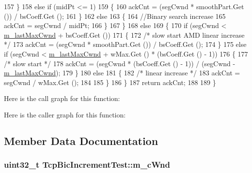\begin{DoxyCode}
157         \}
158       \textcolor{keywordflow}{else} \textcolor{keywordflow}{if} (midPt <= 1)
159         \{
160           ackCnt = (segCwnd * smoothPart.Get ()) / bsCoeff.Get ();
161         \}
162       \textcolor{keywordflow}{else}
163         \{
164           \textcolor{comment}{//Binary search increase}
165           ackCnt = segCwnd / midPt;
166         \}
167     \}
168   \textcolor{keywordflow}{else}
169     \{
170       \textcolor{keywordflow}{if} (segCwnd < \hyperlink{classTcpBicIncrementTest_abc6cf3f641221e276bd5eb67975b1037}{m\_lastMaxCwnd} + bsCoeff.Get ())
171         \{
172           \textcolor{comment}{/* slow start AMD linear increase */}
173           ackCnt = (segCwnd * smoothPart.Get ()) / bsCoeff.Get ();
174         \}
175       \textcolor{keywordflow}{else} \textcolor{keywordflow}{if} (segCwnd < \hyperlink{classTcpBicIncrementTest_abc6cf3f641221e276bd5eb67975b1037}{m\_lastMaxCwnd} + wMax.Get () * (bsCoeff.Get () - 1))
176         \{
177           \textcolor{comment}{/* slow start */}
178           ackCnt = (segCwnd * (bsCoeff.Get () - 1)) / (segCwnd - \hyperlink{classTcpBicIncrementTest_abc6cf3f641221e276bd5eb67975b1037}{m\_lastMaxCwnd});
179         \}
180       \textcolor{keywordflow}{else}
181         \{
182           \textcolor{comment}{/* linear increase */}
183           ackCnt = segCwnd / wMax.Get ();
184 
185         \}
186     \}
187   \textcolor{keywordflow}{return} ackCnt;
188 
189 \}
\end{DoxyCode}


Here is the call graph for this function\+:




Here is the caller graph for this function\+:




\subsection{Member Data Documentation}
\subsubsection[{\texorpdfstring{m\+\_\+c\+Wnd}{m_cWnd}}]{\setlength{\rightskip}{0pt plus 5cm}uint32\+\_\+t Tcp\+Bic\+Increment\+Test\+::m\+\_\+c\+Wnd\hspace{0.3cm}{\ttfamily [private]}}\hypertarget{classTcpBicIncrementTest_ad466007e997817bd877b4c08346a5125}{}\label{classTcpBicIncrementTest_ad466007e997817bd877b4c08346a5125}


